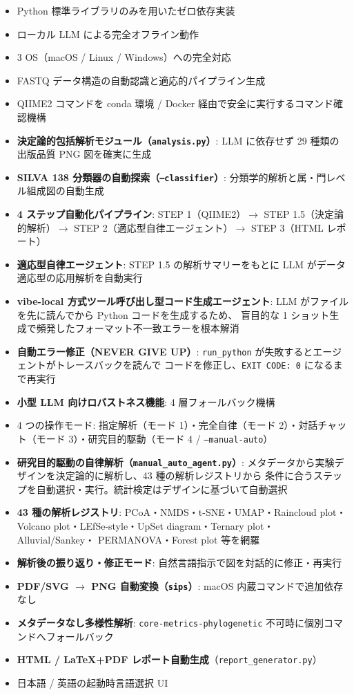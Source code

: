 \documentclass[12pt, a4paper]{article}
\begin{document}
\begin{itemize}
  \item Python 標準ライブラリのみを用いたゼロ依存実装
  \item ローカル LLM による完全オフライン動作
  \item 3 OS（macOS / Linux / Windows）への完全対応
  \item FASTQ データ構造の自動認識と適応的パイプライン生成
  \item QIIME2 コマンドを conda 環境 / Docker 経由で安全に実行するコマンド確認機構
  \item \textbf{決定論的包括解析モジュール（\texttt{analysis.py}）}:
    LLM に依存せず 29 種類の出版品質 PNG 図を確実に生成
  \item \textbf{SILVA 138 分類器の自動探索（\texttt{--classifier}）}:
    分類学的解析と属・門レベル組成図の自動生成
  \item \textbf{4 ステップ自動化パイプライン}:
    STEP 1（QIIME2）$\to$ STEP 1.5（決定論的解析）$\to$ STEP 2（適応型自律エージェント）$\to$ STEP 3（HTML レポート）
  \item \textbf{適応型自律エージェント}: STEP 1.5 の解析サマリーをもとに LLM がデータ適応型の応用解析を自動実行
  \item \textbf{vibe-local 方式ツール呼び出し型コード生成エージェント}:
    LLM がファイルを先に読んでから Python コードを生成するため、
    盲目的な 1 ショット生成で頻発したフォーマット不一致エラーを根本解消
  \item \textbf{自動エラー修正（NEVER GIVE UP）}:
    \texttt{run\_python} が失敗するとエージェントがトレースバックを読んで
    コードを修正し、\texttt{EXIT CODE: 0} になるまで再実行
  \item \textbf{小型 LLM 向けロバストネス機能}: 4 層フォールバック機構
  \item 4 つの操作モード: 指定解析（モード 1）・完全自律（モード 2）・対話チャット（モード 3）・研究目的駆動（モード 4 / \texttt{--manual-auto}）
  \item \textbf{研究目的駆動の自律解析（\texttt{manual\_auto\_agent.py}）}:
    メタデータから実験デザインを決定論的に解析し、43 種の解析レジストリから
    条件に合うステップを自動選択・実行。統計検定はデザインに基づいて自動選択
  \item \textbf{43 種の解析レジストリ}: PCoA・NMDS・t-SNE・UMAP・Raincloud plot・
    Volcano plot・LEfSe-style・UpSet diagram・Ternary plot・Alluvial/Sankey・
    PERMANOVA・Forest plot 等を網羅
  \item \textbf{解析後の振り返り・修正モード}:
    自然言語指示で図を対話的に修正・再実行
  \item \textbf{PDF/SVG $\to$ PNG 自動変換（\texttt{sips}）}:
    macOS 内蔵コマンドで追加依存なし
  \item \textbf{メタデータなし多様性解析}:
    \texttt{core-metrics-phylogenetic} 不可時に個別コマンドへフォールバック
  \item \textbf{HTML / LaTeX+PDF レポート自動生成}（\texttt{report\_generator.py}）
  \item 日本語 / 英語の起動時言語選択 UI
\end{itemize}
\end{document}
